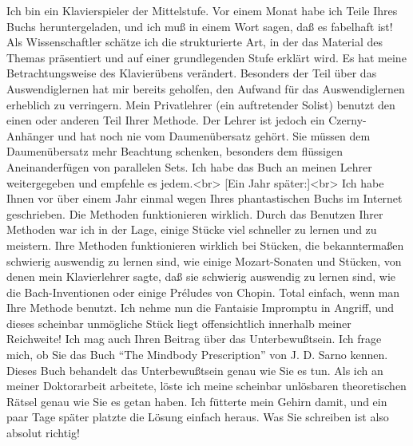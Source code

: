 \item \label{testimonials20}
Ich bin ein Klavierspieler der Mittelstufe.
Vor einem Monat habe ich Teile Ihres Buchs heruntergeladen, und ich muß in einem Wort sagen, daß es fabelhaft ist!
Als Wissenschaftler schätze ich die strukturierte Art, in der das Material des Themas präsentiert und auf einer grundlegenden Stufe erklärt wird.
Es hat meine Betrachtungsweise des Klavierübens verändert.
Besonders der Teil über das Auswendiglernen hat mir bereits geholfen, den Aufwand für das Auswendiglernen erheblich zu verringern.
Mein Privatlehrer (ein auftretender Solist) benutzt den einen oder anderen Teil Ihrer Methode.
Der Lehrer ist jedoch ein Czerny-Anhänger und hat noch nie vom Daumenübersatz gehört.
Sie müssen dem Daumenübersatz mehr Beachtung schenken, besonders dem flüssigen Aneinanderfügen von parallelen Sets.
Ich habe das Buch an meinen Lehrer weitergegeben und empfehle es jedem.<br>
[Ein Jahr später:]<br>
Ich habe Ihnen vor über einem Jahr einmal wegen Ihres phantastischen Buchs im Internet geschrieben.
Die Methoden funktionieren wirklich.
Durch das Benutzen Ihrer Methoden war ich in der Lage, einige Stücke viel schneller zu lernen und zu meistern.
Ihre Methoden funktionieren wirklich bei Stücken, die bekanntermaßen schwierig auswendig zu lernen sind, wie einige Mozart-Sonaten und Stücken, von denen mein Klavierlehrer sagte, daß sie schwierig auswendig zu lernen sind, wie die Bach-Inventionen oder einige Préludes von Chopin.
Total einfach, wenn man Ihre Methode benutzt.
Ich nehme nun die Fantaisie Impromptu in Angriff, und dieses scheinbar unmögliche Stück liegt offensichtlich innerhalb meiner Reichweite!
Ich mag auch Ihren Beitrag über das Unterbewußtsein.
Ich frage mich, ob Sie das Buch \enquote{The Mindbody Prescription} von J. D. Sarno kennen.
Dieses Buch behandelt das Unterbewußtsein genau wie Sie es tun.
Als ich an meiner Doktorarbeit arbeitete, löste ich meine scheinbar unlösbaren theoretischen Rätsel genau wie Sie es getan haben.
Ich fütterte mein Gehirn damit, und ein paar Tage später platzte die Lösung einfach heraus.
Was Sie schreiben ist also absolut richtig!


